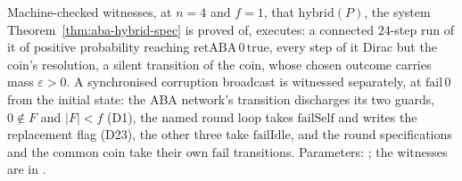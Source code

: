 \begin{definition}
  \label{def:aba-nonvacuity}
  \leanok
  Machine-checked witnesses, at $n = 4$ and $f = 1$, that $\mathrm{hybrid}(P)$, the system Theorem~\ref{thm:aba-hybrid-spec} is proved of, executes: a connected $24$-step run of it of positive probability reaching $\mathrm{retABA}\,0\,\mathrm{true}$, every step of it Dirac but the coin's resolution, a silent transition of the coin, whose chosen outcome carries mass $\varepsilon > 0$.
  A synchronised corruption broadcast is witnessed separately, at $\mathrm{fail}\,0$ from the initial state: the ABA network's transition discharges its two guards, $0 \notin F$ and $|F| < f$ (D1), the named round loop takes $\mathrm{failSelf}$ and writes the replacement flag (D23), the other three take $\mathrm{failIdle}$, and the round specifications and the common coin take their own $\mathrm{fail}$ transitions.
  Parameters: ; the witnesses are in .
\end{definition}
